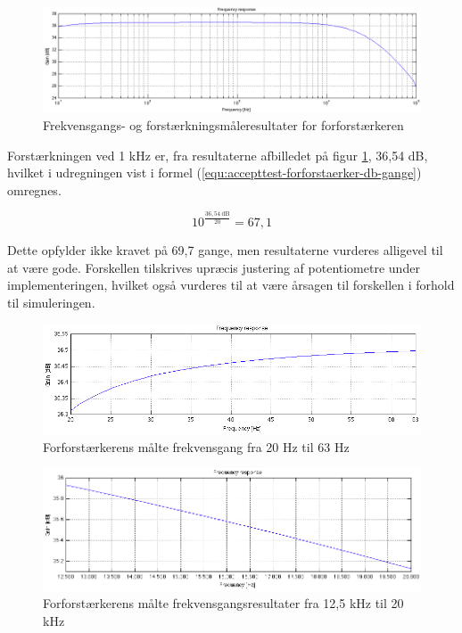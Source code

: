 \begin{figure}[h]
\centering
\includegraphics[width=\textwidth]{maalerapporter/forforstaerker/frekvensrespons-forforstaerker.png}
\caption{Frekvensgangs- og forstærkningsmåleresultater for forforstærkeren}
\label{fig:accepttest-fresultat-forforstaerker}
\end{figure}

Forstærkningen ved 1 kHz er, fra resultaterne afbilledet på figur \ref{fig:accepttest-fresultat-forforstaerker}, 36,54 dB, hvilket i udregningen vist i formel (\ref{equ:accepttest-forforstaerker-db-gange}) omregnes.

\begin{equation}
\label{equ:accepttest-forforstaerker-db-gange}
10^{\frac{\mathrm{36,54~dB}}{20}} = 67,1
\end{equation}

Dette opfylder ikke kravet på 69,7 gange, men resultaterne vurderes alligevel til at være gode. Forskellen tilskrives upræcis justering af potentiometre under implementeringen, hvilket også vurderes til at være årsagen til forskellen i forhold til simuleringen. 

\begin{figure}[h]
\centering
\includegraphics[width=\textwidth]{maalerapporter/forforstaerker/fr20-63.png}
\caption{Forforstærkerens målte frekvensgang fra 20 Hz til 63 Hz}
\label{fig:accepttest-fres-20-63}
\end{figure}

\begin{figure}[h]
\centering
\includegraphics[width=\textwidth]{maalerapporter/forforstaerker/fr12-20k.png}
\caption{Forforstærkerens målte frekvensgangsresultater fra 12,5 kHz til 20 kHz}
\label{fig:accepttest-fres-125-20}
\end{figure}

